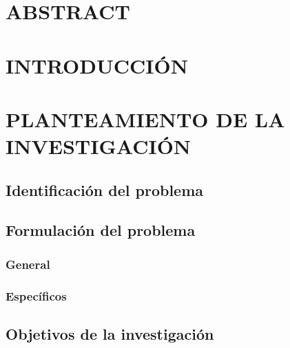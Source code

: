 \documentclass[12pt,a4paper,oneside]{report}
\begin{document}
\chapter*{\centering \large ABSTRACT}



\chapter*{\centering \large INTRODUCCIÓN} %


\chapter{PLANTEAMIENTO DE LA INVESTIGACIÓN}

\section{Identificación del problema}

\section{Formulación del problema}

\subsection{General}

\subsection{Específicos}

\section{Objetivos de la investigación}
\end{document}
